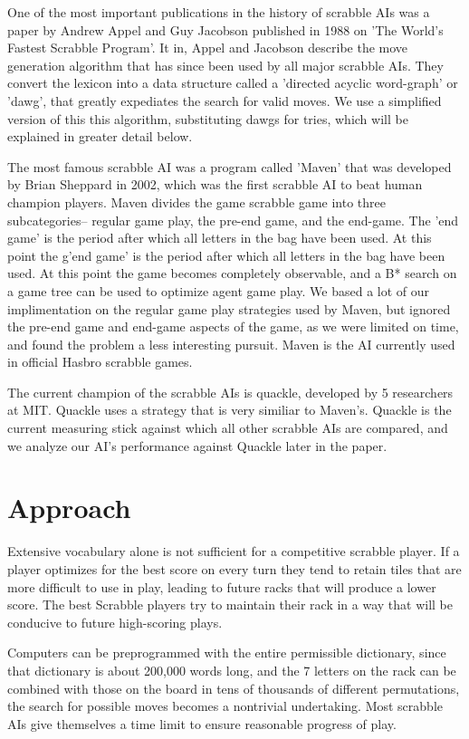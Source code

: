 \documentclass[12pt]{article}
\begin{document}
One of the most important publications in the history of scrabble AIs was a paper by Andrew Appel and Guy Jacobson published in 1988 on 'The World's Fastest Scrabble Program'. It in, Appel and Jacobson describe the move generation algorithm that has since been used by all major scrabble AIs. They convert the lexicon into a data structure called a 'directed acyclic word-graph' or 'dawg', that greatly expediates the search for valid moves. We use a simplified version of this this algorithm, substituting dawgs for tries, which will be explained in greater detail below.  

The most famous scrabble AI was a program called 'Maven' that was developed by Brian Sheppard in 2002, which was the first scrabble AI to beat human champion players.  Maven divides the game scrabble game into three subcategories-- regular game play, the pre-end game, and the end-game. The 'end game' is the period after which all letters in the bag have been used. At this point the g'end game' is the period after which all letters in the bag have been used. At this point the game becomes completely observable, and a B* search on a game tree can be used to optimize agent game play. We based a lot of our implimentation on the regular game play strategies used by Maven, but ignored the pre-end game and end-game aspects of the game, as we were limited on time, and found the problem a less interesting pursuit. Maven is the AI currently used in official Hasbro scrabble games.  

The current champion of the scrabble AIs is quackle, developed by 5 researchers at MIT. Quackle uses a strategy that is very similiar to Maven's. Quackle is the current measuring stick against which all other scrabble AIs are compared, and we analyze our AI's performance against Quackle later in the paper. 

\section*{Approach}
Extensive vocabulary alone is not sufficient for a competitive
scrabble player. If a player optimizes for the best score on every
turn they tend to retain tiles that are more difficult to use in play,
leading to future racks that will produce a lower score. The best
Scrabble players try to maintain their rack in a way that will be
conducive to future high-scoring plays.

Computers can be preprogrammed with the entire permissible dictionary,
since that dictionary is about 200,000 words long, and the 7 letters
on the rack can be combined with those on the board in tens of
thousands of different permutations, the search for possible moves
becomes a nontrivial undertaking. Most scrabble AIs give themselves a
time limit to ensure reasonable progress of play.
\end{document}
